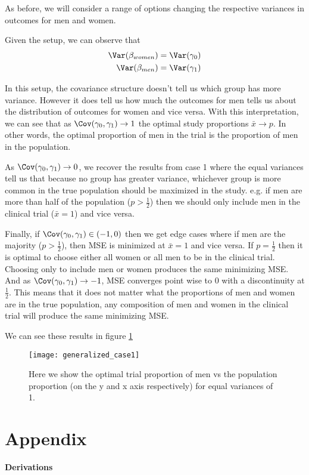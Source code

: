 As before, we will consider a range of options changing the respective variances in outcomes for men and women.

Given the setup, we can observe that
\begin{align*}
	\Var(\beta_{women}) &= \Var(\gamma_0) \\
	\Var(\beta_{men}) &= \Var(\gamma_1)
\end{align*} 

In this setup, the covariance structure doesn't tell us which group has more variance. However it does tell us how much the outcomes for men tells us about the distribution of outcomes for women and vice versa. 
With this interpretation, we can see that as $\Cov(\gamma_0, \gamma_1) \to 1$ the optimal study proportions $\bar{x} \to p$. In other words, the optimal proportion of men in the trial is the proportion of men in the population.

As $\Cov(\gamma_0, \gamma_1) \to 0$, we recover the results from case 1 where the equal variances tell us that because no group has greater variance, whichever group is more common in the true population should be maximized in the study.  e.g. if men are more than half of the population ($p >  \frac{1}{2}$) then we should only include men in the clinical trial ($\bar{x} = 1$) and vice versa.

Finally, if $\Cov(\gamma_0, \gamma_1) \in (-1,0)$ then we get edge cases where if men are the majority ($p > \frac{1}{2}$), then MSE is minimized at $\bar{x} = 1$ and vice versa.
If $p=\frac{1}{2}$ then it is optimal to choose either all women or all men to be in the clinical trial. Choosing only to include men or women produces the same minimizing MSE. 
And as $\Cov(\gamma_0, \gamma_1) \to -1$, MSE converges point wise to 0 with a discontinuity at $\frac{1}{2}$. This means that it does not matter what the proportions of men and women are in the true population, any composition of men and women in the clinical trial will produce the same minimizing MSE.

We can see these results in figure \ref{fig:generalized_case1}

\begin{figure}[ht!]
  \centering
	\texttt{[image: generalized\_case1]}
	\caption{Here we show the optimal trial proportion of men vs the population proportion (on the y and x axis respectively) for equal variances of 1.} 
	\label{fig:generalized_case1}
\end{figure}


\section{Appendix}

\begin{center}
	{\large \bf Derivations }
\end{center}










